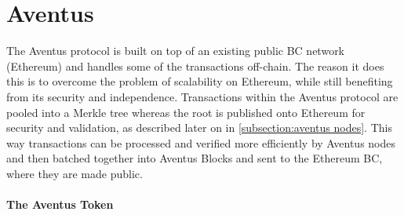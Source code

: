 
\section{Aventus}

\begin{comment}
\subsection{Problems}
\paragraph{Oversight}

The main problem here is defined as a lack of oversight over digital assets from the issuer of these assets/. Oversight is this context is defined as the ability for an issuer see exactly what is happening to their asset at any given moment in order to derive increased value from their digital assets.

\paragraph{Control}

Control allows an issuer to protect the value of their digital assets. In order to achieve total control, the issuer needs control over how their assets are created, managed, and sold.

A lack of control can lead to problems such as distribution of fake copies, price inflation in reselling markets, distribution by unauthorised vendors.
\end{comment}

The Aventus protocol is built on top of an existing public BC network (Ethereum) and handles some of the transactions off-chain. The reason it does this is to overcome the problem of scalability on Ethereum, while still benefiting from its security and independence.
Transactions within the Aventus protocol are pooled into a Merkle tree whereas the root is published onto Ethereum for security and validation, as described later on in \ref{subsection:aventus nodes}.
This way transactions can be processed and verified more efficiently by Aventus nodes and then batched together into Aventus Blocks and sent to the Ethereum BC, where they are made public.

\paragraph{The Aventus Token}

